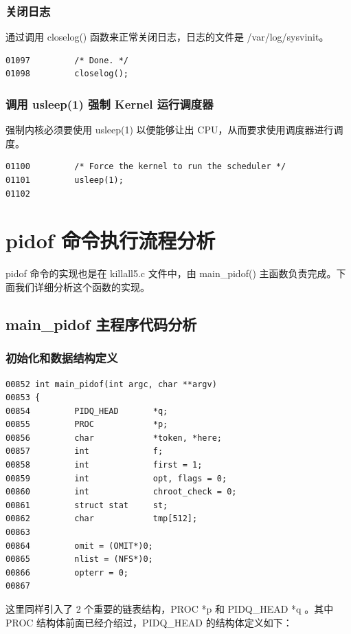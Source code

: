 \subsubsection{关闭日志}

通过调用 closelog() 函数来正常关闭日志，日志的文件是 /var/log/sysvinit。

{\begin{shaded}\begin{verbatim}
01097         /* Done. */
01098         closelog();
\end{verbatim}\end{shaded}}
\subsubsection{调用 usleep(1) 强制 Kernel 运行调度器}

强制内核必须要使用 usleep(1) 以便能够让出
CPU，从而要求使用调度器进行调度。

{\begin{shaded}\begin{verbatim}
01100         /* Force the kernel to run the scheduler */
01101         usleep(1);
01102 
\end{verbatim}\end{shaded}}
\section{pidof 命令执行流程分析}

pidof 命令的实现也是在 killall5.c 文件中，由 main\_pidof()
主函数负责完成。下面我们详细分析这个函数的实现。

\subsection{main\_pidof 主程序代码分析}

\subsubsection{初始化和数据结构定义}

{\begin{shaded}\begin{verbatim}
00852 int main_pidof(int argc, char **argv)
00853 {
00854         PIDQ_HEAD       *q;
00855         PROC            *p;
00856         char            *token, *here;
00857         int             f;
00858         int             first = 1;
00859         int             opt, flags = 0;
00860         int             chroot_check = 0;
00861         struct stat     st;
00862         char            tmp[512];
00863 
00864         omit = (OMIT*)0;
00865         nlist = (NFS*)0;
00866         opterr = 0;
00867 
\end{verbatim}\end{shaded}}
这里同样引入了 2 个重要的链表结构，PROC *p 和 PIDQ\_HEAD *q 。其中 PROC
结构体前面已经介绍过，PIDQ\_HEAD 的结构体定义如下：

